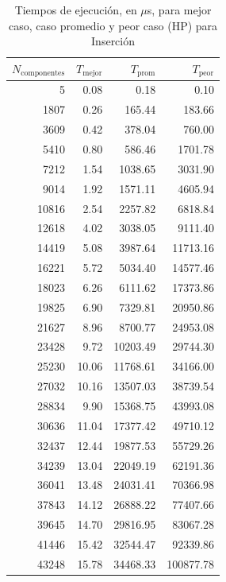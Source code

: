 \documentclass{homework}
\begin{document}
    \begin{table}[H] 
        \footnotesize
        \centering 
        \begin{tabular}{|r|r|r|r|} 
                \hline
                $N_{\text{componentes}}$ & $T_{\text{mejor}}$ & $T_{\text{prom}}$ & $T_{\text{peor}}$ \\
                \hline  
                5 & 0.08 & 0.18 & 0.10 \\ 
                1807 & 0.26 & 165.44 & 183.66 \\ 
                3609 & 0.42 & 378.04 & 760.00 \\ 
                5410 & 0.80 & 586.46 & 1701.78 \\ 
                7212 & 1.54 & 1038.65 & 3031.90 \\ 
                9014 & 1.92 & 1571.11 & 4605.94 \\ 
                10816 & 2.54 & 2257.82 & 6818.84 \\ 
                12618 & 4.02 & 3038.05 & 9111.40 \\ 
                14419 & 5.08 & 3987.64 & 11713.16 \\ 
                16221 & 5.72 & 5034.40 & 14577.46 \\ 
                18023 & 6.26 & 6111.62 & 17373.86 \\ 
                19825 & 6.90 & 7329.81 & 20950.86 \\ 
                21627 & 8.96 & 8700.77 & 24953.08 \\ 
                23428 & 9.72 & 10203.49 & 29744.30 \\ 
                25230 & 10.06 & 11768.61 & 34166.00 \\ 
                27032 & 10.16 & 13507.03 & 38739.54 \\ 
                28834 & 9.90 & 15368.75 & 43993.08 \\ 
                30636 & 11.04 & 17377.42 & 49710.12 \\ 
                32437 & 12.44 & 19877.53 & 55729.26 \\ 
                34239 & 13.04 & 22049.19 & 62191.36 \\ 
                36041 & 13.48 & 24031.41 & 70366.98 \\ 
                37843 & 14.12 & 26888.22 & 77407.66 \\ 
                39645 & 14.70 & 29816.95 & 83067.28 \\ 
                41446 & 15.42 & 32544.47 & 92339.86 \\ 
                43248 & 15.78 & 34468.33 & 100877.78 \\ 
                \hline
        \end{tabular}
        \caption{Tiempos de ejecución, en $\mu$s, para mejor caso, caso promedio y peor caso (HP) para Inserción}
    \end{table}
\end{document}
